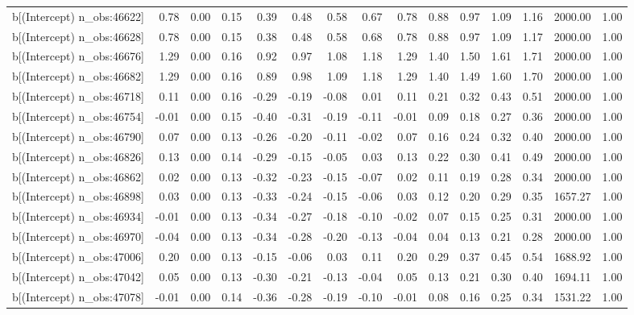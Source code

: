\begin{table}[ht]
\begin{tabular}{rrrrrrrrrrrrrrr}
  b[(Intercept) n\_obs:46622] & 0.78 & 0.00 & 0.15 & 0.39 & 0.48 & 0.58 & 0.67 & 0.78 & 0.88 & 0.97 & 1.09 & 1.16 & 2000.00 & 1.00 \\ 
  b[(Intercept) n\_obs:46628] & 0.78 & 0.00 & 0.15 & 0.38 & 0.48 & 0.58 & 0.68 & 0.78 & 0.88 & 0.97 & 1.09 & 1.17 & 2000.00 & 1.00 \\ 
  b[(Intercept) n\_obs:46676] & 1.29 & 0.00 & 0.16 & 0.92 & 0.97 & 1.08 & 1.18 & 1.29 & 1.40 & 1.50 & 1.61 & 1.71 & 2000.00 & 1.00 \\ 
  b[(Intercept) n\_obs:46682] & 1.29 & 0.00 & 0.16 & 0.89 & 0.98 & 1.09 & 1.18 & 1.29 & 1.40 & 1.49 & 1.60 & 1.70 & 2000.00 & 1.00 \\ 
  b[(Intercept) n\_obs:46718] & 0.11 & 0.00 & 0.16 & -0.29 & -0.19 & -0.08 & 0.01 & 0.11 & 0.21 & 0.32 & 0.43 & 0.51 & 2000.00 & 1.00 \\ 
  b[(Intercept) n\_obs:46754] & -0.01 & 0.00 & 0.15 & -0.40 & -0.31 & -0.19 & -0.11 & -0.01 & 0.09 & 0.18 & 0.27 & 0.36 & 2000.00 & 1.00 \\ 
  b[(Intercept) n\_obs:46790] & 0.07 & 0.00 & 0.13 & -0.26 & -0.20 & -0.11 & -0.02 & 0.07 & 0.16 & 0.24 & 0.32 & 0.40 & 2000.00 & 1.00 \\ 
  b[(Intercept) n\_obs:46826] & 0.13 & 0.00 & 0.14 & -0.29 & -0.15 & -0.05 & 0.03 & 0.13 & 0.22 & 0.30 & 0.41 & 0.49 & 2000.00 & 1.00 \\ 
  b[(Intercept) n\_obs:46862] & 0.02 & 0.00 & 0.13 & -0.32 & -0.23 & -0.15 & -0.07 & 0.02 & 0.11 & 0.19 & 0.28 & 0.34 & 2000.00 & 1.00 \\ 
  b[(Intercept) n\_obs:46898] & 0.03 & 0.00 & 0.13 & -0.33 & -0.24 & -0.15 & -0.06 & 0.03 & 0.12 & 0.20 & 0.29 & 0.35 & 1657.27 & 1.00 \\ 
  b[(Intercept) n\_obs:46934] & -0.01 & 0.00 & 0.13 & -0.34 & -0.27 & -0.18 & -0.10 & -0.02 & 0.07 & 0.15 & 0.25 & 0.31 & 2000.00 & 1.00 \\ 
  b[(Intercept) n\_obs:46970] & -0.04 & 0.00 & 0.13 & -0.34 & -0.28 & -0.20 & -0.13 & -0.04 & 0.04 & 0.13 & 0.21 & 0.28 & 2000.00 & 1.00 \\ 
  b[(Intercept) n\_obs:47006] & 0.20 & 0.00 & 0.13 & -0.15 & -0.06 & 0.03 & 0.11 & 0.20 & 0.29 & 0.37 & 0.45 & 0.54 & 1688.92 & 1.00 \\ 
  b[(Intercept) n\_obs:47042] & 0.05 & 0.00 & 0.13 & -0.30 & -0.21 & -0.13 & -0.04 & 0.05 & 0.13 & 0.21 & 0.30 & 0.40 & 1694.11 & 1.00 \\ 
  b[(Intercept) n\_obs:47078] & -0.01 & 0.00 & 0.14 & -0.36 & -0.28 & -0.19 & -0.10 & -0.01 & 0.08 & 0.16 & 0.25 & 0.34 & 1531.22 & 1.00 \\ 

\end{tabular}
\end{table}
